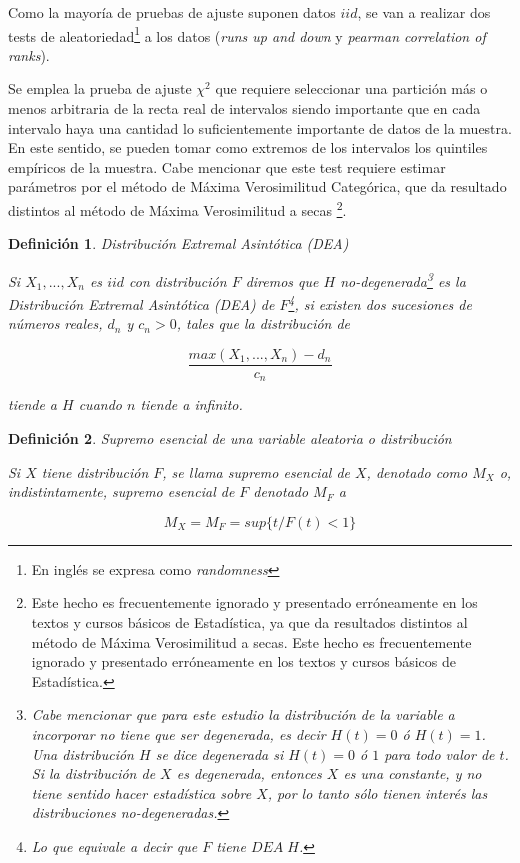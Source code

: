 \documentclass[
  12pt]{article}
\newtheorem{definition}{Definición}[section]
\begin{document}
Como la mayoría de pruebas de ajuste suponen datos \(iid\), se van a
realizar dos tests de
aleatoriedad\footnote{En inglés se expresa como \textit{randomness}} a
los datos (\textit{runs up and down} y
\textit{pearman correlation of ranks}).

Se emplea la prueba de ajuste \(\chi^2\) que requiere seleccionar una
partición más o menos arbitraria de la recta real de intervalos siendo
importante que en cada intervalo haya una cantidad lo suficientemente
importante de datos de la muestra. En este sentido, se pueden tomar como
extremos de los intervalos los quintiles empíricos de la muestra. Cabe
mencionar que este test requiere estimar parámetros por el método de
Máxima Verosimilitud Categórica, que da resultado distintos al método de
Máxima Verosimilitud a secas
\footnote{Este hecho es frecuentemente ignorado y presentado erróneamente en los textos y cursos básicos de Estadística, ya que da resultados distintos al método de Máxima Verosimilitud a secas. Este hecho es frecuentemente ignorado y presentado erróneamente en los textos y cursos básicos de Estadística.}.

\begin{definition} Distribución Extremal Asintótica (DEA)

Si $X_1,...,X_n$  es $iid$ con distribución $F$ diremos que $H$ no-degenerada\footnote{Cabe mencionar que para este estudio la distribución de la variable a incorporar no tiene que ser degenerada, es decir $H(t)=0$ ó $H(t)=1$. Una distribución $H$ se dice degenerada si $H(t)=0$ ó $1$ para todo valor de $t$. Si la distribución de $X$ es degenerada, entonces $X$ es una constante, y no tiene sentido hacer estadística sobre $X$, por lo tanto sólo tienen interés las distribuciones no-degeneradas.} es la Distribución Extremal Asintótica (DEA) de $F$\footnote{Lo que equivale a decir que $F$ tiene $DEA\;H$.}, si existen dos sucesiones de números reales, $d_n$ y $c_n>0$, tales que la distribución de

\begin{equation}
\frac{max(X_1,...,X_n)- d_n}{c_n}\label{eq:max}
\end{equation}

tiende a $H$ cuando $n$ tiende a infinito.
\end{definition}

\begin{definition} Supremo esencial de una variable aleatoria o distribución

Si $X$ tiene distribución $F$, se llama supremo esencial de $X$, denotado como $M_X$ o, indistintamente, supremo esencial de $F$ denotado $M_F$ a

\begin{equation}
M_X=M_F= sup\{t / F(t)<1\}\label{eq:Mx}
\end{equation}
\end{definition}
\end{document}
